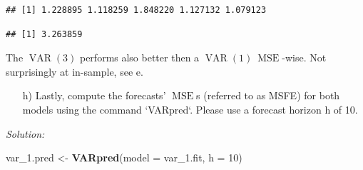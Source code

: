\documentclass[12pt,a4paper]{article}
\newcommand{\MSE}{\operatorname{MSE}} %
\newcommand{\VAR}{\operatorname{VAR}} %
\newenvironment{Shaded}{\begin{snugshade}}{\end{snugshade}}
\newcommand{\DataTypeTok}[1]{\textcolor[rgb]{0.13,0.29,0.53}{#1}}
\newcommand{\DecValTok}[1]{\textcolor[rgb]{0.00,0.00,0.81}{#1}}
\newcommand{\FloatTok}[1]{\textcolor[rgb]{0.00,0.00,0.81}{#1}}
\newcommand{\KeywordTok}[1]{\textcolor[rgb]{0.13,0.29,0.53}{\textbf{#1}}}
\newcommand{\NormalTok}[1]{#1}
\newcommand{\OperatorTok}[1]{\textcolor[rgb]{0.81,0.36,0.00}{\textbf{#1}}}
\newcommand{\StringTok}[1]{\textcolor[rgb]{0.31,0.60,0.02}{#1}}
\begin{document}
\begin{Shaded}
\end{Shaded}

\begin{verbatim}
## [1] 1.228895 1.118259 1.848220 1.127132 1.079123
\end{verbatim}

\begin{Shaded}
\end{Shaded}

\begin{verbatim}
## [1] 3.263859
\end{verbatim}

The \(\VAR(3)\) performs also better then a \(\VAR(1) \ \MSE\)-wise. Not
surprisingly at in-sample, see e.

\begin{itemize}
  \item[h)] Lastly, compute the forecasts’ $\MSE$s (referred to as MSFE) for both models using the command `VARpred`. Please use a forecast horizon h of 10.
\end{itemize}

\emph{Solution:}

\begin{Shaded}
\begin{Highlighting}[]
\NormalTok{var_}\FloatTok{1.}\NormalTok{pred <-}\StringTok{ }\KeywordTok{VARpred}\NormalTok{(}\DataTypeTok{model =}\NormalTok{ var_}\FloatTok{1.}\NormalTok{fit, }\DataTypeTok{h =} \DecValTok{10}\NormalTok{)}
\end{Highlighting}
\end{Shaded}
\end{document}
